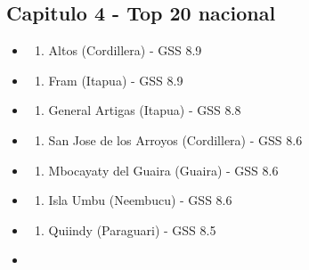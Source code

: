\subsection{Capitulo 4 - Top 20
nacional}\label{capitulo-4---top-20-nacional}

\begin{itemize}
\tightlist
\item
  \begin{enumerate}
  \def\labelenumi{\arabic{enumi}.}
  \tightlist
  \item
    Altos (Cordillera) - GSS 8.9
  \end{enumerate}
\item
  \begin{enumerate}
  \def\labelenumi{\arabic{enumi}.}
  \setcounter{enumi}{1}
  \tightlist
  \item
    Fram (Itapua) - GSS 8.9
  \end{enumerate}
\item
  \begin{enumerate}
  \def\labelenumi{\arabic{enumi}.}
  \setcounter{enumi}{2}
  \tightlist
  \item
    General Artigas (Itapua) - GSS 8.8
  \end{enumerate}
\item
  \begin{enumerate}
  \def\labelenumi{\arabic{enumi}.}
  \setcounter{enumi}{3}
  \tightlist
  \item
    San Jose de los Arroyos (Cordillera) - GSS 8.6
  \end{enumerate}
\item
  \begin{enumerate}
  \def\labelenumi{\arabic{enumi}.}
  \setcounter{enumi}{4}
  \tightlist
  \item
    Mbocayaty del Guaira (Guaira) - GSS 8.6
  \end{enumerate}
\item
  \begin{enumerate}
  \def\labelenumi{\arabic{enumi}.}
  \setcounter{enumi}{5}
  \tightlist
  \item
    Isla Umbu (Neembucu) - GSS 8.6
  \end{enumerate}
\item
  \begin{enumerate}
  \def\labelenumi{\arabic{enumi}.}
  \setcounter{enumi}{6}
  \tightlist
  \item
    Quiindy (Paraguari) - GSS 8.5
  \end{enumerate}
\item

\end{itemize}
